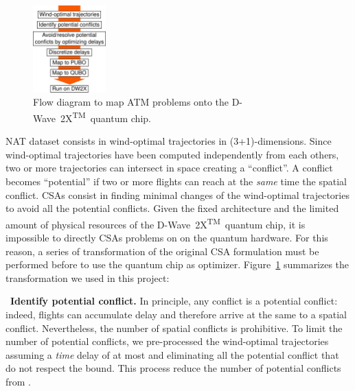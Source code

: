 \documentclass[9pt]{extarticle}
\renewcommand{\figurename}{Figure}
\newcommand{\note}[1][]{\added[remark={#1}]}
\newcommand{\DW}{\mbox{D-Wave 2X\textsuperscript{TM}}~}
\begin{document}
%
\begin{figure}
\centering
\includegraphics[width=0.25\textwidth]{scheme}
\caption{\label{fig:scheme}Flow diagram to map ATM problems onto the \DW quantum chip.}
\end{figure}
%
NAT dataset consists in \note[What is the number of trajectories?]{XXX} wind-optimal trajectories in (3+1)-dimensions. Since wind-optimal
trajectories have been computed independently from each others, two or more trajectories can intersect in space creating a ``conflict''. 
A conflict becomes ``potential'' if two or more flights can reach at the \emph{same} time the spatial conflict. CSAs consist
in finding minimal changes of the wind-optimal trajectories to avoid all the potential conflicts. 
Given the fixed architecture and the limited amount of physical resources of the \DW quantum chip, it is impossible to directly CSAs problems
on on the quantum hardware. For this reason, a series of transformation of the original CSA formulation must be performed before 
to use the quantum chip as optimizer. \figurename~\ref{fig:scheme} summarizes the transformation we used in this project:

\begin{changemargin}{0.5cm}{0cm}
\textbullet~\textbf{Identify potential conflict.} In principle, any conflict is a potential conflict: indeed, flights can accumulate delay
and therefore arrive at the same to a spatial conflict. Nevertheless, the number of spatial conflicts is prohibitive. To limit the number
of potential conflicts, we pre-processed the wind-optimal trajectories assuming a \emph{time} delay of at most \note[Check this]{$1$ hour} and
eliminating all the potential conflict that do not respect the bound. This process reduce the number of potential conflicts from
\note[Please add some numbers.]{XXX to XXX}.
\end{changemargin}
\end{document}
